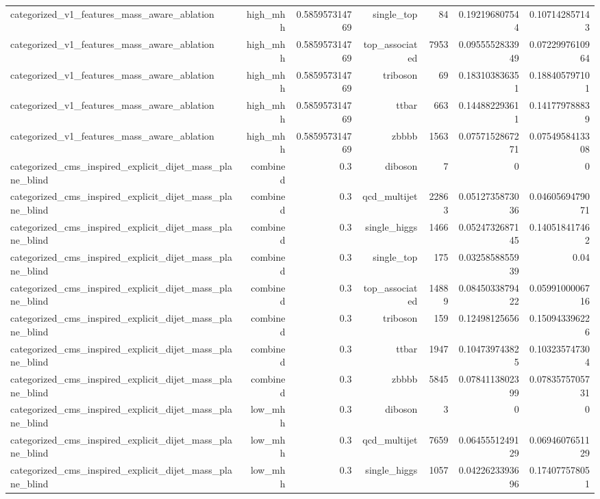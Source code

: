\begin{table}[htbp]
{\begin{tabular}{lrrrrrr}
categorized\_v1\_features\_mass\_aware\_ablation & high\_mhh & 0.585957314769 & single\_top & 84 & 0.192196807544 & 0.107142857143 \\
categorized\_v1\_features\_mass\_aware\_ablation & high\_mhh & 0.585957314769 & top\_associated & 7953 & 0.0955552833949 & 0.0722997610964 \\
categorized\_v1\_features\_mass\_aware\_ablation & high\_mhh & 0.585957314769 & triboson & 69 & 0.183103836351 & 0.188405797101 \\
categorized\_v1\_features\_mass\_aware\_ablation & high\_mhh & 0.585957314769 & ttbar & 663 & 0.144882293611 & 0.141779788839 \\
categorized\_v1\_features\_mass\_aware\_ablation & high\_mhh & 0.585957314769 & zbbbb & 1563 & 0.0757152867271 & 0.0754958413308 \\
categorized\_cms\_inspired\_explicit\_dijet\_mass\_plane\_blind & combined & 0.3 & diboson & 7 & 0 & 0 \\
categorized\_cms\_inspired\_explicit\_dijet\_mass\_plane\_blind & combined & 0.3 & qcd\_multijet & 22863 & 0.0512735873036 & 0.0460569479071 \\
categorized\_cms\_inspired\_explicit\_dijet\_mass\_plane\_blind & combined & 0.3 & single\_higgs & 1466 & 0.0524732687145 & 0.140518417462 \\
categorized\_cms\_inspired\_explicit\_dijet\_mass\_plane\_blind & combined & 0.3 & single\_top & 175 & 0.0325858855939 & 0.04 \\
categorized\_cms\_inspired\_explicit\_dijet\_mass\_plane\_blind & combined & 0.3 & top\_associated & 14889 & 0.0845033879422 & 0.0599100006716 \\
categorized\_cms\_inspired\_explicit\_dijet\_mass\_plane\_blind & combined & 0.3 & triboson & 159 & 0.12498125656 & 0.150943396226 \\
categorized\_cms\_inspired\_explicit\_dijet\_mass\_plane\_blind & combined & 0.3 & ttbar & 1947 & 0.104739743825 & 0.103235747304 \\
categorized\_cms\_inspired\_explicit\_dijet\_mass\_plane\_blind & combined & 0.3 & zbbbb & 5845 & 0.0784113802399 & 0.0783575705731 \\
categorized\_cms\_inspired\_explicit\_dijet\_mass\_plane\_blind & low\_mhh & 0.3 & diboson & 3 & 0 & 0 \\
categorized\_cms\_inspired\_explicit\_dijet\_mass\_plane\_blind & low\_mhh & 0.3 & qcd\_multijet & 7659 & 0.0645551249129 & 0.0694607651129 \\
categorized\_cms\_inspired\_explicit\_dijet\_mass\_plane\_blind & low\_mhh & 0.3 & single\_higgs & 1057 & 0.0422623393696 & 0.174077578051 \\

\end{tabular}}
\end{table}
